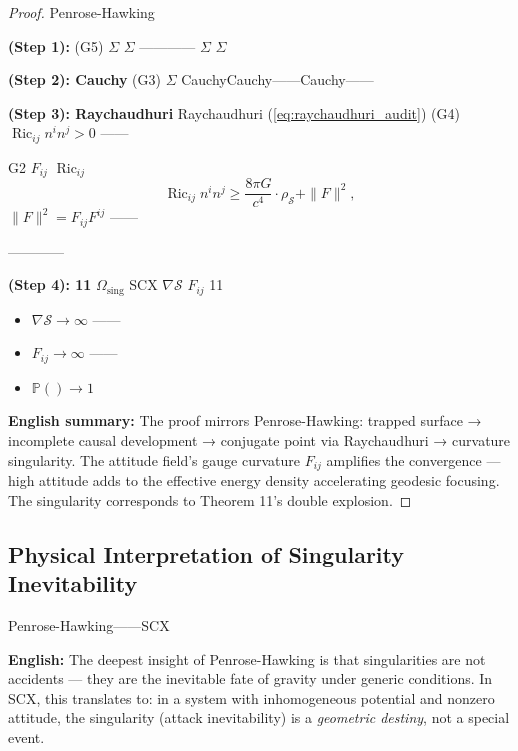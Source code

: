 \documentclass[12pt,a4paper]{article}
\theoremstyle{remark}
\newcommand{\Pbb}{\mathbb{P}}
\DeclareMathOperator{\Ric}{Ric}
\newcommand{\cG}{G}          %
\newcommand{\cC}{c}          %
\begin{document}
\begin{proof}
Penrose-Hawking

\textbf{ (Step 1): }
 (G5)  $\Sigma$ $\Sigma$ ———— $\Sigma$  $\Sigma$ 

\textbf{ (Step 2): Cauchy}
 (G3)  $\Sigma$ CauchyCauchy——Cauchy——

\textbf{ (Step 3): Raychaudhuri}
Raychaudhuri (\ref{eq:raychaudhuri_audit})  (G4)  $\Ric_{ij}n^i n^j > 0$ ——

 G2 $F_{ij}$  $\Ric_{ij}$ 
\begin{equation}
    \Ric_{ij} n^i n^j \geq \frac{8\pi \cG}{\cC^4} \cdot \rho_{\mathcal{S}} + \|F\|^2,
\end{equation}
 $\|F\|^2 = F_{ij}F^{ij}$ ——

————

\textbf{ (Step 4): 11}
 $\Omega_{\mathrm{sing}}$ SCX $\nabla\mathcal{S}$  $F_{ij}$ 11\textbf{}
\begin{itemize}
    \item $\nabla\mathcal{S} \to \infty$ ——
    \item $F_{ij} \to \infty$ ——
    \item  $\Pbb(\text{}) \to 1$ 
\end{itemize}

\textbf{English summary:} The proof mirrors Penrose-Hawking: trapped surface → incomplete causal development → conjugate point via Raychaudhuri → curvature singularity. The attitude field's gauge curvature $F_{ij}$ amplifies the convergence — high attitude adds to the effective energy density accelerating geodesic focusing. The singularity corresponds to Theorem 11's double explosion.
\end{proof}

\subsection{}
\subsection{Physical Interpretation of Singularity Inevitability}

\noindent
\textbf{} Penrose-Hawking——\textbf{}SCX\textbf{}

\vspace{4pt}
\noindent
\textbf{English:} The deepest insight of Penrose-Hawking is that singularities are not accidents — they are the inevitable fate of gravity under generic conditions. In SCX, this translates to: in a system with inhomogeneous potential and nonzero attitude, the singularity (attack inevitability) is a \textit{geometric destiny}, not a special event.
\end{document}
